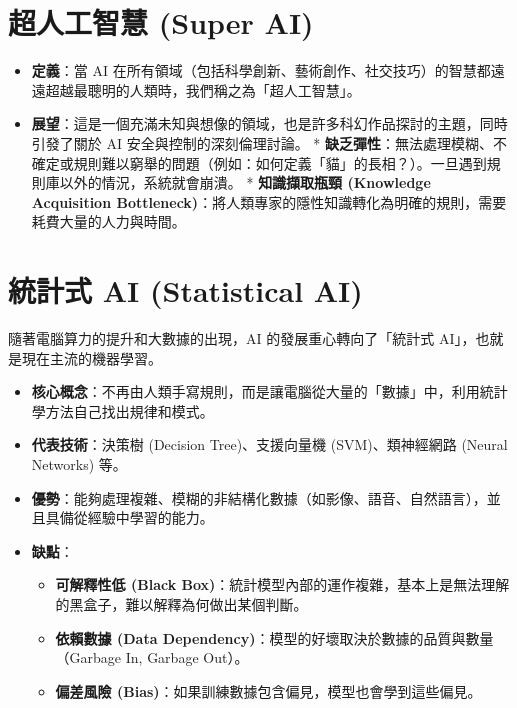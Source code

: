 \documentclass[
  letterpaper,
  DIV=11,
  numbers=noendperiod]{scrreprt}
\providecommand{\tightlist}{%
  \setlength{\itemsep}{0pt}\setlength{\parskip}{0pt}}
\begin{document}
\section{超人工智慧 (Super AI)}\label{sec-super-ai}

\begin{itemize}
\tightlist
\item
  \textbf{定義}：當 AI
  在所有領域（包括科學創新、藝術創作、社交技巧）的智慧都遠遠超越最聰明的人類時，我們稱之為「超人工智慧」。
\item
  \textbf{展望}：這是一個充滿未知與想像的領域，也是許多科幻作品探討的主題，同時引發了關於
  AI 安全與控制的深刻倫理討論。 *
  \textbf{缺乏彈性}：無法處理模糊、不確定或規則難以窮舉的問題（例如：如何定義「貓」的長相？）。一旦遇到規則庫以外的情況，系統就會崩潰。
  * \textbf{知識擷取瓶頸 (Knowledge Acquisition
  Bottleneck)}：將人類專家的隱性知識轉化為明確的規則，需要耗費大量的人力與時間。
\end{itemize}

\section{統計式 AI (Statistical AI)}\label{sec-statistical-ai}

隨著電腦算力的提升和大數據的出現，AI 的發展重心轉向了「統計式
AI」，也就是現在主流的機器學習。

\begin{itemize}
\tightlist
\item
  \textbf{核心概念}：不再由人類手寫規則，而是讓電腦從大量的「數據」中，利用統計學方法自己找出規律和模式。
\item
  \textbf{代表技術}：決策樹 (Decision Tree)、支援向量機
  (SVM)、類神經網路 (Neural Networks) 等。
\item
  \textbf{優勢}：能夠處理複雜、模糊的非結構化數據（如影像、語音、自然語言），並且具備從經驗中學習的能力。
\item
  \textbf{缺點}：

  \begin{itemize}
  \tightlist
  \item
    \textbf{可解釋性低 (Black
    Box)}：統計模型內部的運作複雜，基本上是無法理解的黑盒子，難以解釋為何做出某個判斷。
  \item
    \textbf{依賴數據 (Data
    Dependency)}：模型的好壞取決於數據的品質與數量（Garbage In, Garbage
    Out）。
  \item
    \textbf{偏差風險
    (Bias)}：如果訓練數據包含偏見，模型也會學到這些偏見。
  \end{itemize}
\end{itemize}
\end{document}

